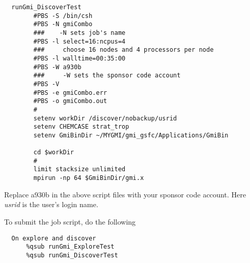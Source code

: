 \begin{verbatim}
  runGmi_DiscoverTest
        #PBS -S /bin/csh
        #PBS -N gmiCombo
        ###    -N sets job's name
        #PBS -l select=16:ncpus=4
        ###     choose 16 nodes and 4 processors per node
        #PBS -l walltime=00:35:00
        #PBS -W a930b
        ###     -W sets the sponsor code account
        #PBS -V
        #PBS -e gmiCombo.err
        #PBS -o gmiCombo.out
        #
        setenv workDir /discover/nobackup/usrid
        setenv CHEMCASE strat_trop
        setenv GmiBinDir ~/MYGMI/gmi_gsfc/Applications/GmiBin

        cd $workDir
        #
        limit stacksize unlimited
        mpirun -np 64 $GmiBinDir/gmi.x
\end{verbatim}

\begin{remark}
Replace a930b in the above script files with your sponsor code account.
Here {\em usrid} is the user's login name.
\end{remark}

To submit the job script, do the following
%
\begin{verbatim}
  On explore and discover
      %qsub runGmi_ExploreTest
      %qsub runGmi_DiscoverTest
\end{verbatim}
%
%
%

